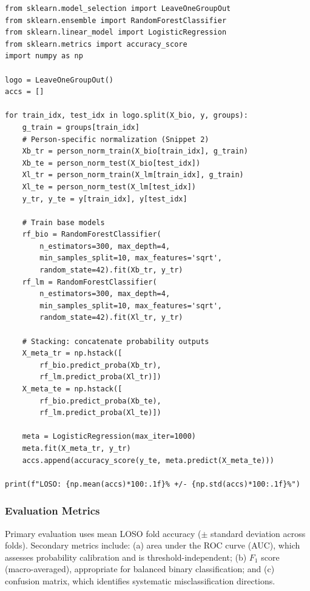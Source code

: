 \documentclass[10pt, twocolumn]{article}
\begin{document}
\begin{lstlisting}[caption={Core LOSO evaluation loop for the stacked fusion model. Arrays \texttt{X\_bio} and \texttt{X\_lm} contain unnormalized features; \texttt{y} contains binary labels; \texttt{groups} contains subject IDs.}, label={lst:loso}]
from sklearn.model_selection import LeaveOneGroupOut
from sklearn.ensemble import RandomForestClassifier
from sklearn.linear_model import LogisticRegression
from sklearn.metrics import accuracy_score
import numpy as np

logo = LeaveOneGroupOut()
accs = []

for train_idx, test_idx in logo.split(X_bio, y, groups):
    g_train = groups[train_idx]
    # Person-specific normalization (Snippet 2)
    Xb_tr = person_norm_train(X_bio[train_idx], g_train)
    Xb_te = person_norm_test(X_bio[test_idx])
    Xl_tr = person_norm_train(X_lm[train_idx], g_train)
    Xl_te = person_norm_test(X_lm[test_idx])
    y_tr, y_te = y[train_idx], y[test_idx]

    # Train base models
    rf_bio = RandomForestClassifier(
        n_estimators=300, max_depth=4,
        min_samples_split=10, max_features='sqrt',
        random_state=42).fit(Xb_tr, y_tr)
    rf_lm = RandomForestClassifier(
        n_estimators=300, max_depth=4,
        min_samples_split=10, max_features='sqrt',
        random_state=42).fit(Xl_tr, y_tr)

    # Stacking: concatenate probability outputs
    X_meta_tr = np.hstack([
        rf_bio.predict_proba(Xb_tr),
        rf_lm.predict_proba(Xl_tr)])
    X_meta_te = np.hstack([
        rf_bio.predict_proba(Xb_te),
        rf_lm.predict_proba(Xl_te)])

    meta = LogisticRegression(max_iter=1000)
    meta.fit(X_meta_tr, y_tr)
    accs.append(accuracy_score(y_te, meta.predict(X_meta_te)))

print(f"LOSO: {np.mean(accs)*100:.1f}% +/- {np.std(accs)*100:.1f}%")
\end{lstlisting}

\subsubsection{Evaluation Metrics}

Primary evaluation uses mean LOSO fold accuracy ($\pm$ standard deviation across folds).
Secondary metrics include: (a) area under the ROC curve (AUC), which assesses probability
calibration and is threshold-independent; (b) $F_1$ score (macro-averaged), appropriate
for balanced binary classification; and (c) confusion matrix, which identifies systematic
misclassification directions.
\end{document}
